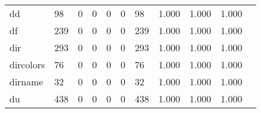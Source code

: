 \begin{longtable}{lp{1.20cm}p{1.20cm}p{1.20cm}p{1.20cm}p{1.20cm}p{1.20cm}p{1.20cm}p{1.20cm}p{1.20cm}p{1.20cm}}
dd        &                                    98 &                                                  0 &                                                  0 &                                                  0 &                                                  0 &                                                 98 &                                         1.000 &                                              1.000 &                                              1.000 \\
df        &                                   239 &                                                  0 &                                                  0 &                                                  0 &                                                  0 &                                                239 &                                         1.000 &                                              1.000 &                                              1.000 \\
dir       &                                   293 &                                                  0 &                                                  0 &                                                  0 &                                                  0 &                                                293 &                                         1.000 &                                              1.000 &                                              1.000 \\
dircolors &                                    76 &                                                  0 &                                                  0 &                                                  0 &                                                  0 &                                                 76 &                                         1.000 &                                              1.000 &                                              1.000 \\
dirname   &                                    32 &                                                  0 &                                                  0 &                                                  0 &                                                  0 &                                                 32 &                                         1.000 &                                              1.000 &                                              1.000 \\
du        &                                   438 &                                                  0 &                                                  0 &                                                  0 &                                                  0 &                                                438 &                                         1.000 &                                              1.000 &                                              1.000 \\

\end{longtable}
